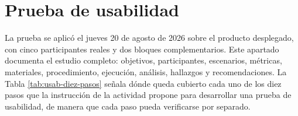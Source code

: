 \section{Prueba de usabilidad}\label{sec:a5-usabilidad}

La prueba se aplicó el jueves 20 de agosto de 2026 sobre el producto desplegado, con cinco
participantes reales y dos bloques complementarios. Este apartado documenta el estudio completo:
objetivos, participantes, escenarios, métricas, materiales, procedimiento, ejecución, análisis,
hallazgos y recomendaciones. La Tabla \ref{tab:usab-diez-pasos} señala dónde queda cubierto cada
uno de los diez pasos que la instrucción de la actividad propone para desarrollar una prueba de
usabilidad, de manera que cada paso pueda verificarse por separado.

